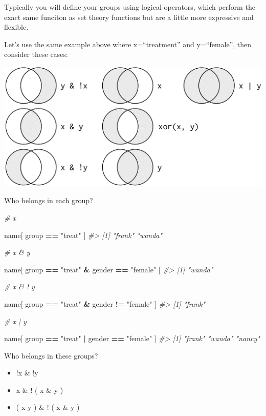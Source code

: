 \documentclass[]{book}
\newenvironment{Shaded}{\begin{snugshade}}{\end{snugshade}}
\newcommand{\CommentTok}[1]{\textcolor[rgb]{0.56,0.35,0.01}{\textit{#1}}}
\newcommand{\NormalTok}[1]{#1}
\newcommand{\OperatorTok}[1]{\textcolor[rgb]{0.81,0.36,0.00}{\textbf{#1}}}
\newcommand{\StringTok}[1]{\textcolor[rgb]{0.31,0.60,0.02}{#1}}
\providecommand{\tightlist}{%
  \setlength{\itemsep}{0pt}\setlength{\parskip}{0pt}}
\theoremstyle{definition}
\theoremstyle{definition}
\theoremstyle{definition}
\theoremstyle{remark}
\begin{document}
Typically you will define your groups using logical operators, which
perform the exact same funciton as set theory functions but are a little
more expressive and flexible.

Let's use the same example above where x=``treatment'' and y=``female'',
then consider these cases:

\includegraphics{figures/set_theory.png}

Who belongs in each group?

\begin{Shaded}
\begin{Highlighting}[]

\CommentTok{#   x}

\NormalTok{name[ group }\OperatorTok{==}\StringTok{ "treat"}\NormalTok{ ]}
\CommentTok{#> [1] "frank" "wanda"}

\CommentTok{#   x & y}

\NormalTok{name[ group }\OperatorTok{==}\StringTok{ "treat"} \OperatorTok{&}\StringTok{ }\NormalTok{gender }\OperatorTok{==}\StringTok{ "female"}\NormalTok{ ]}
\CommentTok{#> [1] "wanda"}

\CommentTok{#   x & ! y}

\NormalTok{name[ group }\OperatorTok{==}\StringTok{ "treat"} \OperatorTok{&}\StringTok{ }\NormalTok{gender }\OperatorTok{!=}\StringTok{ "female"}\NormalTok{ ]}
\CommentTok{#> [1] "frank"}

\CommentTok{#  x | y}

\NormalTok{name[ group }\OperatorTok{==}\StringTok{ "treat"} \OperatorTok{|}\StringTok{ }\NormalTok{gender }\OperatorTok{==}\StringTok{ "female"}\NormalTok{ ]}
\CommentTok{#> [1] "frank" "wanda" "nancy"}
\end{Highlighting}
\end{Shaded}

Who belongs in these groups?

\begin{itemize}
\tightlist
\item
  !x \& !y
\item
  x \& ! ( x \& y )
\item
  ( x \textbar{} y ) \& ! ( x \& y )
\end{itemize}
\end{document}
